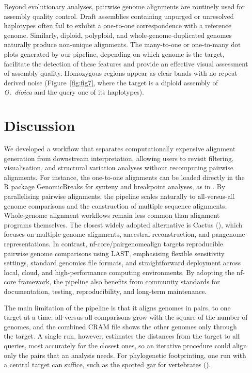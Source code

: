 \documentclass[PCJ,Unicode,screen]{cedram}
\begin{document}
Beyond evolutionary analyses, pairwise genome alignments are routinely used for assembly quality control. Draft assemblies containing unpurged or unresolved haplotypes often fail to exhibit a one-to-one correspondence with a reference genome. Similarly, diploid, polyploid, and whole-genome-duplicated genomes naturally produce non-unique alignments. The many-to-one or one-to-many dot plots generated by our pipeline, depending on which genome is the target, facilitate the detection of these features and provide an effective visual assessment of assembly quality. Homozygous regions appear as clear bands with no repeat-derived noise (Figure~\ref{fig:fig7}, where the target is a diploid assembly of \emph{O.~dioica} and the query one of its haplotypes).

\section*{Discussion}

We developed a workflow that separates computationally expensive alignment generation from downstream interpretation, allowing users to revisit filtering, visualisation, and structural variation analyses without recomputing pairwise alignments. For instance, the one-to-one alignments can be loaded directly in the R package GenomicBreaks for synteny and breakpoint analyses, as in \citet{Plessy_2024}. By parallelising pairwise alignments, the pipeline scales naturally to all-versus-all genome comparisons and the construction of multiple sequence alignments. Whole-genome alignment workflows remain less common than alignment programs themselves. The closest widely adopted alternative is Cactus (\cite{Armstrong_2020}), which focuses on multiple-genome alignments, ancestral reconstruction, and pangenome representations. In contrast, nf-core/pairgenomealign targets reproducible pairwise genome comparisons using LAST, emphasising flexible sensitivity settings, standard genomics file formats, and straightforward deployment across local, cloud, and high-performance computing environments. By adopting the nf-core framework, the pipeline also benefits from community standards for documentation, testing, reproducibility, and long-term maintenance.

The main limitation of the pipeline is that it aligns genomes in pairs, to one target at a time: all-versus-all comparisons grow with the square of the number of genomes, and the combined CRAM file shows the other genomes only through the target. A single run, however, estimates the distances from the target to all queries, most accurately for the closest ones, so an iterative procedure could align only the pairs that an analysis needs. For phylogenetic footprinting, one run with a central target can suffice, such as the spotted gar for vertebrates (\cite{Braasch_2016}).
\end{document}
